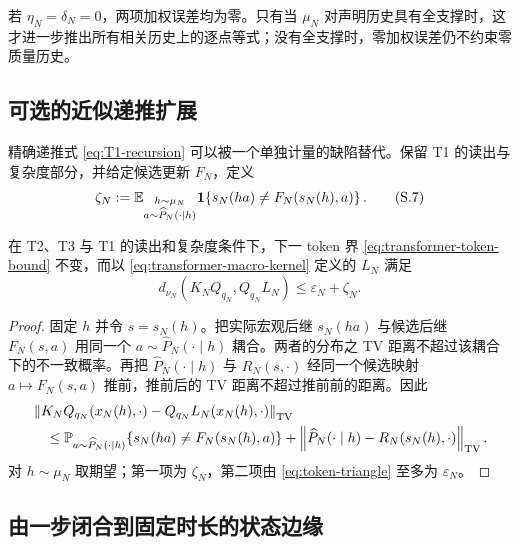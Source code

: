 \begin{remark}[精确情形]
若 $\eta_N=\delta_N=0$，两项加权误差均为零。只有当 $\mu_N$ 对声明历史具有全支撑时，这才进一步推出所有相关历史上的逐点等式；没有全支撑时，零加权误差仍不约束零质量历史。
\end{remark}

\subsection{可选的近似递推扩展}

精确递推式 \eqref{eq:T1-recursion} 可以被一个单独计量的缺陷替代。保留 T1 的读出与复杂度部分，并给定候选更新 $F_N$，定义
\[
 \zeta_N
 :=\mathbb E_{\substack{h\sim\mu_N\\
                         a\sim\widehat P_N(\cdot\mid h)}}
 \mathbf 1\!\left\{s_N(ha)\ne F_N(s_N(h),a)\right\}.
 \tag{S.7}\label{eq:recursion-defect}
\]

\begin{proposition}[近似递推]
\label{prop:transformer-approx-recursion}
在 T2、T3 与 T1 的读出和复杂度条件下，下一 token 界
\eqref{eq:transformer-token-bound} 不变，而以
\eqref{eq:transformer-macro-kernel} 定义的 $L_N$ 满足
\[
 d_{\nu_N}(K_NQ_{q_N},Q_{q_N}L_N)
 \le\varepsilon_N+\zeta_N.
 \tag{S.8}\label{eq:approx-recursion-bound}
\]
\end{proposition}

\begin{proof}
固定 $h$ 并令 $s=s_N(h)$。把实际宏观后继
$s_N(ha)$ 与候选后继 $F_N(s,a)$ 用同一个
$a\sim\widehat P_N(\cdot\mid h)$ 耦合。两者的分布之 TV 距离不超过该耦合下的不一致概率。再把
$\widehat P_N(\cdot\mid h)$ 与 $R_N(s,\cdot)$ 经同一个候选映射
$a\mapsto F_N(s,a)$ 推前，推前后的 TV 距离不超过推前前的距离。因此
\[
 \begin{aligned}
 &\left\|K_NQ_{q_N}(x_N(h),\cdot)
       -Q_{q_N}L_N(x_N(h),\cdot)\right\|_{\operatorname{TV}}\\
 &\quad\le
 \mathbb P_{a\sim\widehat P_N(\cdot\mid h)}
 \{s_N(ha)\ne F_N(s_N(h),a)\}
 +\left\|\widehat P_N(\cdot\mid h)-R_N(s_N(h),\cdot)\right\|_{\operatorname{TV}}.
 \end{aligned}
\]
对 $h\sim\mu_N$ 取期望；第一项为 $\zeta_N$，第二项由
\eqref{eq:token-triangle} 至多为 $\varepsilon_N$。
\end{proof}

\subsection{由一步闭合到固定时长的状态边缘}

